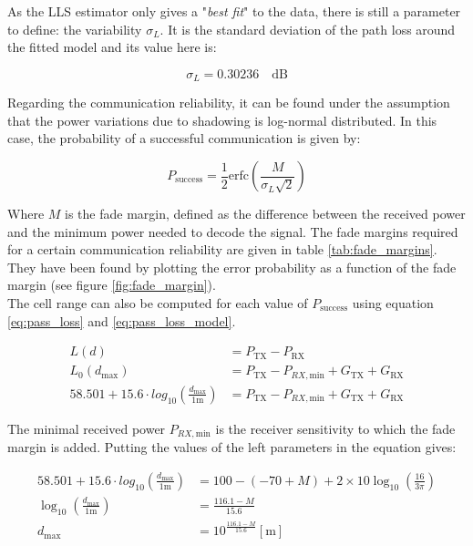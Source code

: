\documentclass[10pt,a4paper]{ULBreport}
\begin{document}
As the LLS estimator only gives a "\textit{best fit}" to the data, there is still a parameter to define: the variability $\sigma_L$. It is the standard deviation of the path loss around the fitted model and its value here is:

\begin{equation*}
    \sigma_L = 0.30236 \quad \text{dB}
\end{equation*}

Regarding the communication reliability, it can be found under the assumption that the power variations due to shadowing is log-normal distributed. In this case, the probability of a successful communication is given by:

\begin{equation}
    \label{eq:pass_loss_probability}
    P_{\text{success}} = \frac{1}{2} \text{erfc}\left(\frac{M}{\sigma_L\sqrt{2}}\right) 
\end{equation}

Where $M$ is the fade margin, defined as the difference between the received power and the minimum power needed to decode the signal. The fade margins required for a certain communication reliability are given in table \ref{tab:fade_margins}. They have been found by plotting the error probability as a function of the fade margin (see figure \ref{fig:fade_margin}). \\
The cell range can also be computed for each value of $P_{\text{success}}$ using equation \ref{eq:pass_loss} and \ref{eq:pass_loss_model}. 

\begin{align*}
    L(d) &= P_{\text{TX}} - P_{\text{RX}}\\
    L_0(d_\text{max}) &= P_{\text{TX}} - P_{RX, \text{min}} + G_{\text{TX}} + G_{\text{RX}}\\
    58.501 + 15.6 \cdot log_{10} \left(\frac{d_{\text{max}}}{1\text{m}}\right) &= P_{\text{TX}} - P_{RX, \text{min}} + G_{\text{TX}} + G_{\text{RX}}
\end{align*}

The minimal received power $P_{RX, \text{min}}$ is the receiver sensitivity to which the fade margin is added. Putting the values of the left parameters in the equation gives:

\begin{align*}
    58.501 + 15.6 \cdot log_{10} \left(\frac{d_{\text{max}}}{1\text{m}}\right) &= 100 - (-70 + M) + 2 \times 10 \log_{10} \left(\frac{16}{3\pi}\right)\\
    \log_{10} \left(\frac{d_{\text{max}}}{1\text{m}}\right) &= \frac{116.1 - M}{15.6}\\
    d_{\text{max}} &= 10^{\frac{116.1 - M}{15.6}} \left[\text{m}\right]
\end{align*}
\end{document}
